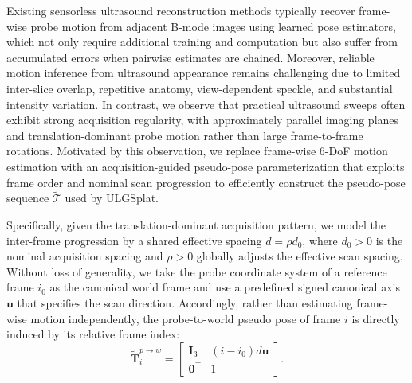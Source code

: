 Existing sensorless ultrasound reconstruction methods typically recover
frame-wise probe motion from adjacent B-mode images using learned pose
estimators, which not only require additional training and computation but
also suffer from accumulated errors when pairwise estimates are chained.
Moreover, reliable motion inference from ultrasound appearance remains
challenging due to limited inter-slice overlap, repetitive anatomy,
view-dependent speckle, and substantial intensity variation. In contrast, we
observe that practical ultrasound sweeps often exhibit strong acquisition
regularity, with approximately parallel imaging planes and
translation-dominant probe motion rather than large frame-to-frame rotations.
Motivated by this observation, we replace frame-wise 6-DoF motion estimation
with an acquisition-guided pseudo-pose parameterization that exploits frame
order and nominal scan progression to efficiently construct the pseudo-pose
sequence $\widetilde{\mathcal T}$ used by ULGSplat.

Specifically, given the translation-dominant acquisition pattern, we model the
inter-frame progression by a shared effective spacing $d=\rho d_0$, where
$d_0>0$ is the nominal acquisition spacing and $\rho>0$ globally adjusts 
the effective scan spacing. Without loss of generality, we take the probe coordinate system of
a reference frame $i_0$ as the canonical world frame and use a predefined 
signed canonical axis $\mathbf u$ that specifies the scan direction.
Accordingly, rather than estimating frame-wise motion independently, the
probe-to-world pseudo pose of frame $i$ is directly induced by its relative
frame index:
\begin{equation}
\widetilde{\mathbf T}_i^{p\rightarrow w}
=
\begin{bmatrix}
\mathbf I_3 & (i-i_0)d\mathbf u\\
\mathbf 0^\top & 1
\end{bmatrix}.
\label{eq:calibration-geometry-single}
\end{equation}

